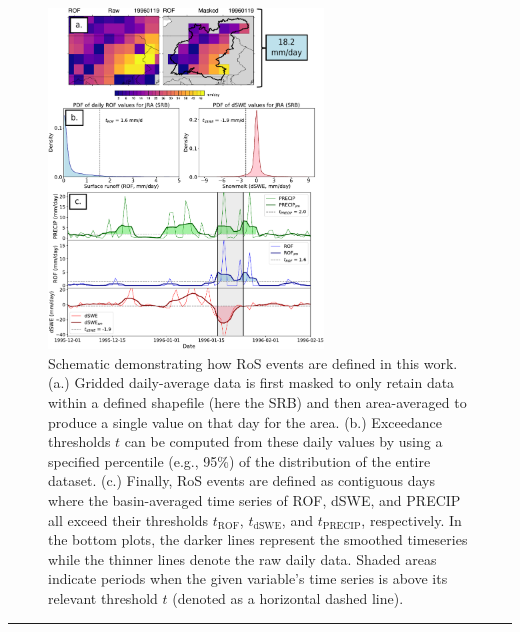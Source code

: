\documentclass{article}
\newcommand{\genDisc}[1]{\medskip \hrule \vspace{0.25cm}
               {\itshape {\color{violet}{#1}\color{black}} }}
\begin{document}
{\begin{figure}[H]
\centering
\noindent\includegraphics[width=0.65\textwidth]{figs/cropped/schematic.pdf}
\caption{{\color{Orange}Schematic demonstrating how RoS events are defined in this work. (a.) Gridded daily-average data is first masked to only retain data within a defined shapefile (here the SRB) and then area-averaged to produce a single value on that day for the area. (b.) Exceedance thresholds $t$ can be computed from these daily values by using a specified percentile (e.g., 95\%) of the distribution of the entire dataset. (c.) Finally, RoS events are defined as contiguous days where the basin-averaged time series of ROF, dSWE, and PRECIP all exceed their thresholds $t_{\textrm{ROF}}$, $t_{\textrm{dSWE}}$, and $t_{\textrm{PRECIP}}$, respectively. In the bottom plots, the darker lines represent the smoothed timeseries while the thinner lines denote the raw daily data. Shaded areas indicate periods when the given variable's time series is above its relevant threshold $t$ (denoted as a horizontal dashed line).}}
\label{fig:schematic}
\end{figure}
}

\genDisc{The method is applied to one basin. This is OK, but also a bit a thin basis for introducing a method. Across what range of areas is your method likely applicable?

The comparison of climate data for a single basin (section 3.1) is useful, but it would be a lot more useful to systematically test how these things vary? (i.e. beyond this specific basin).}
\end{document}
